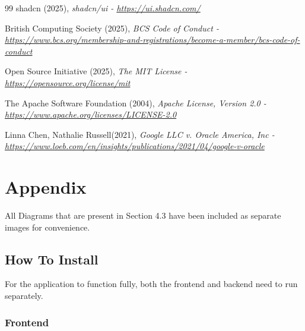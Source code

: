 \documentclass[]{final_report}
\begin{document}
\begin{thebibliography}{99}
 shadcn (2025),
\emph{shadcn/ui - \url{https://ui.shadcn.com/}}


 British Computing Society (2025),
\emph{BCS Code of Conduct - \url{https://www.bcs.org/membership-and-registrations/become-a-member/bcs-code-of-conduct}}

 Open Source Initiative (2025),
\emph{The MIT License - \url{https://opensource.org/license/mit}}

 The Apache Software Foundation (2004),
\emph{Apache License, Version 2.0 - \url{https://www.apache.org/licenses/LICENSE-2.0}}

 Linna Chen, Nathalie Russell(2021),
\emph{Google LLC v. Oracle America, Inc - \url{https://www.loeb.com/en/insights/publications/2021/04/google-v-oracle}}

\end{thebibliography}

\chapter*{Appendix}

All Diagrams that are present in Section 4.3 have been included as separate images for convenience.


\section*{How To Install}

For the application to function fully, both the frontend and backend need to run separately.

\subsection*{Frontend}
\end{document}
